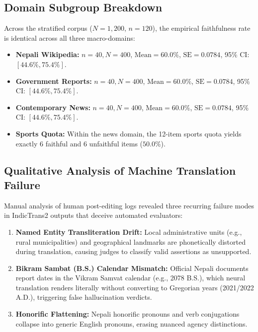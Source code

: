 \documentclass[conference]{IEEEtran}
\begin{document}
\subsection{Domain Subgroup Breakdown}
Across the stratified corpus ($N=1,200$, $n=120$), the empirical faithfulness rate is identical across all three macro-domains:
\begin{itemize}
    \item \textbf{Nepali Wikipedia:} $n=40, N=400$, $\text{Mean} = 60.0\%$, $\text{SE} = 0.0784$, 95\% CI: $[44.6\%, 75.4\%]$.
    \item \textbf{Government Reports:} $n=40, N=400$, $\text{Mean} = 60.0\%$, $\text{SE} = 0.0784$, 95\% CI: $[44.6\%, 75.4\%]$.
    \item \textbf{Contemporary News:} $n=40, N=400$, $\text{Mean} = 60.0\%$, $\text{SE} = 0.0784$, 95\% CI: $[44.6\%, 75.4\%]$.
    \item \textbf{Sports Quota:} Within the news domain, the 12-item sports quota yields exactly 6 faithful and 6 unfaithful items ($50.0\%$).
\end{itemize}

\subsection{Qualitative Analysis of Machine Translation Failure}
Manual analysis of human post-editing logs revealed three recurring failure modes in IndicTrans2 outputs that deceive automated evaluators:
\begin{enumerate}
    \item \textbf{Named Entity Transliteration Drift:} Local administrative units (e.g., rural municipalities) and geographical landmarks are phonetically distorted during translation, causing judges to classify valid assertions as unsupported.
    \item \textbf{Bikram Sambat (B.S.) Calendar Mismatch:} Official Nepali documents report dates in the Vikram Samvat calendar (e.g., 2078 B.S.), which neural translation renders literally without converting to Gregorian years (2021/2022 A.D.), triggering false hallucination verdicts.
    \item \textbf{Honorific Flattening:} Nepali honorific pronouns and verb conjugations collapse into generic English pronouns, erasing nuanced agency distinctions.
\end{enumerate}
\end{document}
